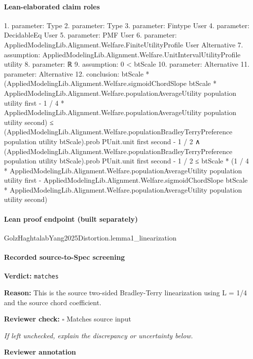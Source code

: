 \documentclass[10pt]{article}
\newcommand{\reviewerbox}{%
  \par\noindent\fbox{\parbox{0.96\linewidth}{\rule{0pt}{0.38in}}}\par
}
\newcommand{\reviewmatch}[1]{%
  \par\noindent\textbf{Reviewer check:} $\square$\; #1\par
  \noindent\emph{If left unchecked, explain the discrepancy or uncertainty below.}\par
}
\begin{document}
\paragraph{Lean-elaborated claim roles}\begin{ReviewVerbatim}
1. parameter: Type
2. parameter: Type
3. parameter: Fintype User
4. parameter: DecidableEq User
5. parameter: PMF User
6. parameter: AppliedModelingLib.Alignment.Welfare.FiniteUtilityProfile User Alternative
7. assumption: AppliedModelingLib.Alignment.Welfare.UnitIntervalUtilityProfile utility
8. parameter: ℝ
9. assumption: 0 < btScale
10. parameter: Alternative
11. parameter: Alternative
12. conclusion: btScale *
      (AppliedModelingLib.Alignment.Welfare.sigmoidChordSlope btScale *
          AppliedModelingLib.Alignment.Welfare.populationAverageUtility population utility first -
        1 / 4 * AppliedModelingLib.Alignment.Welfare.populationAverageUtility population utility second) ≤
    (AppliedModelingLib.Alignment.Welfare.populationBradleyTerryPreference population utility btScale).prob PUnit.unit
        first second -
      1 / 2 ∧
  (AppliedModelingLib.Alignment.Welfare.populationBradleyTerryPreference population utility btScale).prob PUnit.unit
        first second -
      1 / 2 ≤
    btScale *
      (1 / 4 * AppliedModelingLib.Alignment.Welfare.populationAverageUtility population utility first -
        AppliedModelingLib.Alignment.Welfare.sigmoidChordSlope btScale *
          AppliedModelingLib.Alignment.Welfare.populationAverageUtility population utility second)
\end{ReviewVerbatim}

\paragraph{Lean proof endpoint (built separately)}\begin{ReviewVerbatim}
GolzHaghtalabYang2025Distortion.lemma1_linearization
\end{ReviewVerbatim}

\paragraph{Recorded source-to-Spec screening}
\textbf{Verdict:} \texttt{matches}
\\
{\raggedright
\textbf{Reason:} This is the source two-\allowbreak{}sided Bradley-\allowbreak{}Terry linearization using L = 1/\allowbreak{}4 and the source chord coefficient.\allowbreak{}
\par}
\reviewmatch{Matches source input}
\noindent\textbf{Reviewer annotation}\par
\reviewerbox
\clearpage
\hypertarget{source-claim-43099ab484dcdf43}{}
\end{document}

